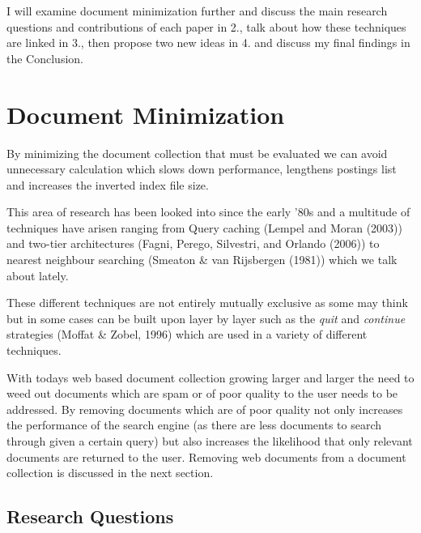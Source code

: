 \documentclass{acm_proc_article-sp}
\begin{document}
I will examine document minimization further and discuss the main research questions and contributions of each paper in 2., talk about how these techniques are linked in 3., then propose two new ideas in 4. and discuss my final findings in the Conclusion.

\section{Document Minimization}

By minimizing the document collection that must be evaluated we can avoid unnecessary calculation which slows down performance, lengthens postings list and increases the inverted index file size.

This area of research has been looked into since the early '80s and a multitude of techniques have arisen ranging from Query caching (Lempel and Moran (2003)) and two-tier architectures (Fagni, Perego, Silvestri, and Orlando (2006)) to nearest neighbour searching (Smeaton \& van Rijsbergen (1981)) which we talk about lately.

These different techniques are not entirely mutually exclusive as some may think but in some cases can be built upon layer by layer such as the \emph{quit} and \emph{continue} strategies (Moffat \& Zobel, 1996) which are used in a variety of different techniques. 

With todays web based document collection growing larger and larger the need to weed out documents which are spam or of poor quality to the user needs to be addressed. By removing documents which are of poor quality not only increases the performance of the search engine (as there are less documents to search through given a certain query) but also increases the likelihood that only relevant documents are returned to the user. Removing web documents from a document collection is discussed in the next section.

\subsection{Research Questions}
\end{document}

